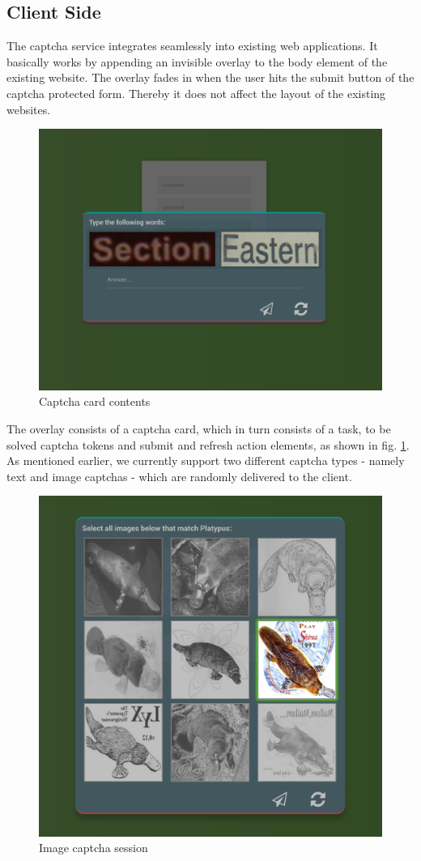 \subsection{Client Side}
\label{subsec:Client Side}
The captcha service integrates seamlessly into existing web applications. It basically works by appending an invisible overlay to the body element of the existing website. The overlay fades in when the user hits the submit button of the captcha protected form. Thereby it does not affect the layout of the existing websites.
\begin{figure}[!h]
	\centering
	\includegraphics[width=0.7\linewidth]{content/figures/captcha_words.png}
	\caption{Captcha card contents}
	\label{fig:captcha_words}
\end{figure}

 The overlay consists of a captcha card, which in turn consists of a task, to be solved captcha tokens and submit and refresh action elements, as shown in fig. \ref{fig:captcha_words}. As mentioned earlier, we currently support two different captcha types - namely text and image captchas - which are randomly delivered to the client. 
 
 \begin{figure}[!h]
	\centering
	\includegraphics[width=0.7\linewidth]{content/figures/captcha_images.png}
	\caption{Image captcha session}
	\label{fig:captcha_images}
\end{figure}
 

